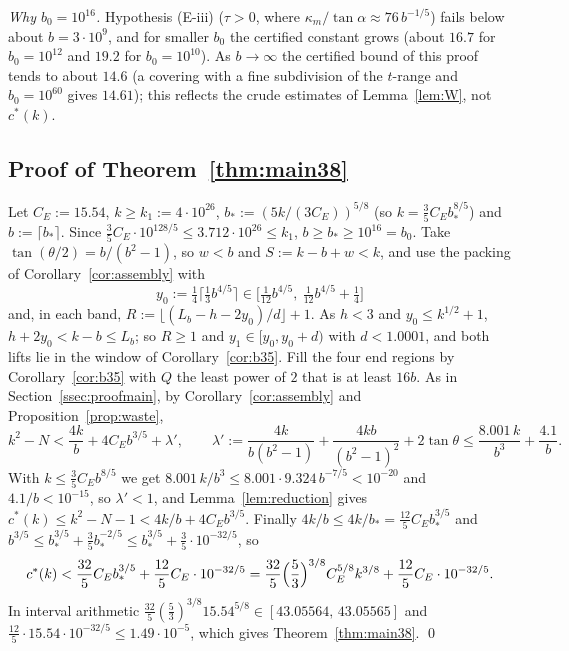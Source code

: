 \documentclass[11pt]{amsart}
\newcommand{\cs}{c^{*}}
\newcommand{\ta}{\tan\alpha}
\theoremstyle{definition}
\theoremstyle{remark}
\numberwithin{equation}{section}
\begin{document}
\emph{Why $b_0=10^{16}$.} Hypothesis (E-iii) ($\tau>0$, where $\kappa_m/\ta\approx76\,b^{-1/5}$) fails below about
$b=3\cdot10^9$, and for smaller $b_0$ the certified constant grows (about $16.7$ for $b_0=10^{12}$ and $19.2$ for
$b_0=10^{10}$). As $b\to\infty$ the certified bound of this proof tends to about $14.6$ (a covering with a fine
subdivision of the $t$-range and $b_0=10^{60}$ gives $14.61$); this reflects the crude estimates of Lemma~\ref{lem:W},
not $\cs(k)$.

\subsection{Proof of Theorem~\ref{thm:main38}}\label{ssec:proofthm38}
Let $C_E:=15.54$, $k\ge k_1:=4\cdot10^{26}$, $b_*:=(5k/(3C_E))^{5/8}$ (so $k=\frac35C_Eb_*^{8/5}$) and $b:=\lceil b_*\rceil$.
Since $\frac35C_E\cdot10^{128/5}\le3.712\cdot10^{26}\le k_1$, $b\ge b_*\ge10^{16}=b_0$. Take $\tan(\theta/2)=b/(b^2-1)$, so
$w<b$ and $S:=k-b+w<k$, and use the packing of Corollary~\ref{cor:assembly} with
\[
y_0:=\tfrac14\bigl\lceil\tfrac13b^{4/5}\bigr\rceil\in\bigl[\tfrac1{12}b^{4/5},\ \tfrac1{12}b^{4/5}+\tfrac14\bigr]
\]
and, in each band, $R:=\lfloor(L_b-h-2y_0)/d\rfloor+1$. As $h<3$ and $y_0\le k^{1/2}+1$, $h+2y_0<k-b\le L_b$; so $R\ge1$ and
$y_1\in[y_0,y_0+d)$ with $d<1.0001$, and both lifts lie in the window of Corollary~\ref{cor:b35}. Fill the four end regions
by Corollary~\ref{cor:b35} with $Q$ the least power of $2$ that is at least $16b$. As in Section~\ref{ssec:proofmain},
by Corollary~\ref{cor:assembly} and Proposition~\ref{prop:waste},
\[
k^2-N<\frac{4k}b+4C_Eb^{3/5}+\lambda',\qquad \lambda':=\frac{4k}{b(b^2-1)}+\frac{4kb}{(b^2-1)^2}+2\tan\theta\le
\frac{8.001\,k}{b^3}+\frac{4.1}b .
\]
With $k\le\frac35C_Eb^{8/5}$ we get $8.001\,k/b^3\le8.001\cdot9.324\,b^{-7/5}<10^{-20}$ and $4.1/b<10^{-15}$, so $\lambda'<1$,
and Lemma~\ref{lem:reduction} gives $\cs(k)\le k^2-N-1<4k/b+4C_Eb^{3/5}$. Finally $4k/b\le4k/b_*=\frac{12}5C_Eb_*^{3/5}$
and $b^{3/5}\le b_*^{3/5}+\frac35b_*^{-2/5}\le b_*^{3/5}+\frac35\cdot10^{-32/5}$, so
\[
\cs(k)<\frac{32}5C_Eb_*^{3/5}+\frac{12}5C_E\cdot10^{-32/5}
=\frac{32}5\Bigl(\frac53\Bigr)^{3/8}C_E^{5/8}k^{3/8}+\frac{12}5C_E\cdot10^{-32/5}.
\]
In interval arithmetic $\frac{32}5(\frac53)^{3/8}15.54^{5/8}\in[43.05564,\,43.05565]$ and
$\frac{12}5\cdot15.54\cdot10^{-32/5}\le1.49\cdot10^{-5}$, which gives Theorem~\ref{thm:main38}. \qed
\end{document}
